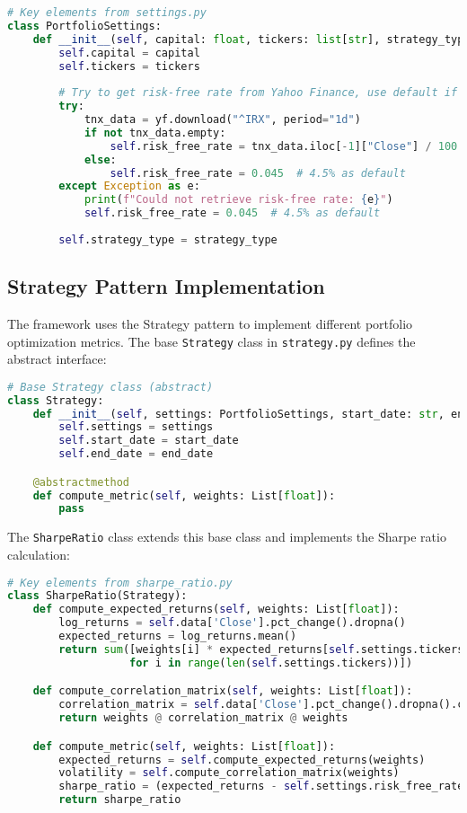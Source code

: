 \documentclass[11pt,a4paper]{article}
\begin{document}
\begin{lstlisting}[language=Python]
# Key elements from settings.py
class PortfolioSettings:
    def __init__(self, capital: float, tickers: list[str], strategy_type: str):
        self.capital = capital
        self.tickers = tickers
        
        # Try to get risk-free rate from Yahoo Finance, use default if it fails
        try:
            tnx_data = yf.download("^IRX", period="1d")
            if not tnx_data.empty:
                self.risk_free_rate = tnx_data.iloc[-1]["Close"] / 100
            else:
                self.risk_free_rate = 0.045  # 4.5% as default
        except Exception as e:
            print(f"Could not retrieve risk-free rate: {e}")
            self.risk_free_rate = 0.045  # 4.5% as default
            
        self.strategy_type = strategy_type
\end{lstlisting}

\subsection{Strategy Pattern Implementation}

The framework uses the Strategy pattern to implement different portfolio optimization metrics. The base \texttt{Strategy} class in \texttt{strategy.py} defines the abstract interface:

\begin{lstlisting}[language=Python]
# Base Strategy class (abstract)
class Strategy:
    def __init__(self, settings: PortfolioSettings, start_date: str, end_date: str) -> None:
        self.settings = settings
        self.start_date = start_date
        self.end_date = end_date

    @abstractmethod
    def compute_metric(self, weights: List[float]):
        pass
\end{lstlisting}

The \texttt{SharpeRatio} class extends this base class and implements the Sharpe ratio calculation:

\begin{lstlisting}[language=Python]
# Key elements from sharpe_ratio.py
class SharpeRatio(Strategy):
    def compute_expected_returns(self, weights: List[float]):
        log_returns = self.data['Close'].pct_change().dropna()
        expected_returns = log_returns.mean()
        return sum([weights[i] * expected_returns[self.settings.tickers[i]] 
                   for i in range(len(self.settings.tickers))])

    def compute_correlation_matrix(self, weights: List[float]):
        correlation_matrix = self.data['Close'].pct_change().dropna().corr()
        return weights @ correlation_matrix @ weights

    def compute_metric(self, weights: List[float]):
        expected_returns = self.compute_expected_returns(weights)
        volatility = self.compute_correlation_matrix(weights)
        sharpe_ratio = (expected_returns - self.settings.risk_free_rate) / np.sqrt(volatility)
        return sharpe_ratio
\end{lstlisting}
\end{document}

